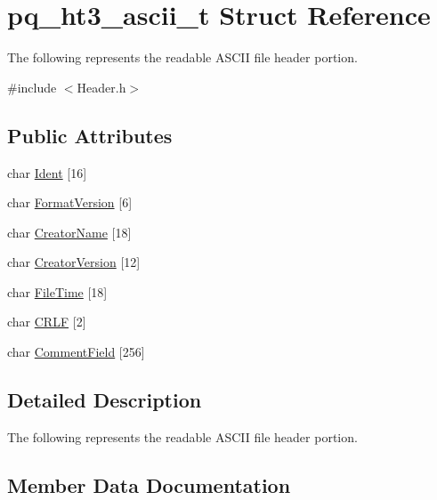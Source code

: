 \hypertarget{structpq__ht3__ascii__t}{}\section{pq\+\_\+ht3\+\_\+ascii\+\_\+t Struct Reference}
\label{structpq__ht3__ascii__t}


The following represents the readable A\+S\+C\+II file header portion.  




{\ttfamily \#include $<$Header.\+h$>$}

\subsection*{Public Attributes}
\begin{DoxyCompactItemize}
\item 
char \hyperlink{structpq__ht3__ascii__t_ae3a8c20334e0edc651a1ae9b8cd566aa}{Ident} \mbox{[}16\mbox{]}
\item 
char \hyperlink{structpq__ht3__ascii__t_ab0a74839197fdc3ac0bda27fbcb0cf0e}{Format\+Version} \mbox{[}6\mbox{]}
\item 
char \hyperlink{structpq__ht3__ascii__t_a11584e1305a54189223e2586c2345e32}{Creator\+Name} \mbox{[}18\mbox{]}
\item 
char \hyperlink{structpq__ht3__ascii__t_a6fde2560bb26549cbf7444b0f5836260}{Creator\+Version} \mbox{[}12\mbox{]}
\item 
char \hyperlink{structpq__ht3__ascii__t_a96b82e042cf5ccf55aadbea72518792e}{File\+Time} \mbox{[}18\mbox{]}
\item 
char \hyperlink{structpq__ht3__ascii__t_ac24c4cf275f92ec8d3d7e44176082c81}{C\+R\+LF} \mbox{[}2\mbox{]}
\item 
char \hyperlink{structpq__ht3__ascii__t_a0bcb4b7000a27419dbb012c8b5cf55d0}{Comment\+Field} \mbox{[}256\mbox{]}
\end{DoxyCompactItemize}


\subsection{Detailed Description}
The following represents the readable A\+S\+C\+II file header portion. 

\subsection{Member Data Documentation}
\mbox{\label{structpq__ht3__ascii__t_a0bcb4b7000a27419dbb012c8b5cf55d0}} 
